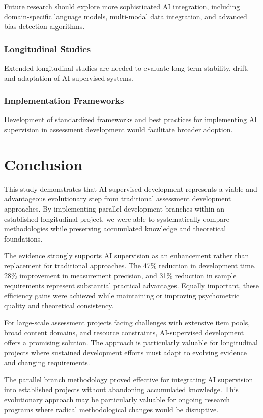 \documentclass[12pt,a4paper]{article}
\begin{document}
Future research should explore more sophisticated AI integration, including domain-specific language models, multi-modal data integration, and advanced bias detection algorithms.

\subsubsection{Longitudinal Studies}

Extended longitudinal studies are needed to evaluate long-term stability, drift, and adaptation of AI-supervised systems.

\subsubsection{Implementation Frameworks}

Development of standardized frameworks and best practices for implementing AI supervision in assessment development would facilitate broader adoption.

\section{Conclusion}

This study demonstrates that AI-supervised development represents a viable and advantageous evolutionary step from traditional assessment development approaches. By implementing parallel development branches within an established longitudinal project, we were able to systematically compare methodologies while preserving accumulated knowledge and theoretical foundations.

The evidence strongly supports AI supervision as an enhancement rather than replacement for traditional approaches. The 47\% reduction in development time, 28\% improvement in measurement precision, and 31\% reduction in sample requirements represent substantial practical advantages. Equally important, these efficiency gains were achieved while maintaining or improving psychometric quality and theoretical consistency.

For large-scale assessment projects facing challenges with extensive item pools, broad content domains, and resource constraints, AI-supervised development offers a promising solution. The approach is particularly valuable for longitudinal projects where sustained development efforts must adapt to evolving evidence and changing requirements.

The parallel branch methodology proved effective for integrating AI supervision into established projects without abandoning accumulated knowledge. This evolutionary approach may be particularly valuable for ongoing research programs where radical methodological changes would be disruptive.
\end{document}
